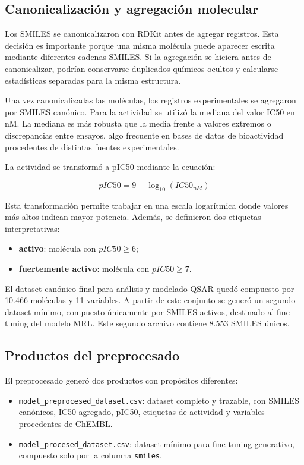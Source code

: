 \documentclass[IB]{TFUOC}%
\begin{document}
\subsection{Canonicalización y agregación molecular}

Los SMILES se canonicalizaron con RDKit antes de agregar registros. Esta decisión es importante porque una misma molécula puede aparecer escrita mediante diferentes cadenas SMILES. Si la agregación se hiciera antes de canonicalizar, podrían conservarse duplicados químicos ocultos y calcularse estadísticas separadas para la misma estructura.

Una vez canonicalizadas las moléculas, los registros experimentales se agregaron por SMILES canónico. Para la actividad se utilizó la mediana del valor IC50 en nM. La mediana es más robusta que la media frente a valores extremos o discrepancias entre ensayos, algo frecuente en bases de datos de bioactividad procedentes de distintas fuentes experimentales.

La actividad se transformó a pIC50 mediante la ecuación:

\begin{equation}
    pIC50 = 9 - \log_{10}(IC50_{nM})
\end{equation}

Esta transformación permite trabajar en una escala logarítmica donde valores más altos indican mayor potencia. Además, se definieron dos etiquetas interpretativas:

\begin{itemize}
    \item \textbf{activo}: molécula con $pIC50 \geq 6$;
    \item \textbf{fuertemente activo}: molécula con $pIC50 \geq 7$.
\end{itemize}

El dataset canónico final para análisis y modelado QSAR quedó compuesto por 10.466 moléculas y 11 variables. A partir de este conjunto se generó un segundo dataset mínimo, compuesto únicamente por SMILES activos, destinado al fine-tuning del modelo MRL. Este segundo archivo contiene 8.553 SMILES únicos.

\subsection{Productos del preprocesado}

El preprocesado generó dos productos con propósitos diferentes:

\begin{itemize}
    \item \texttt{model\_preprocesed\_dataset.csv}: dataset completo y trazable, con SMILES canónicos, IC50 agregado, pIC50, etiquetas de actividad y variables procedentes de ChEMBL.
    \item \texttt{model\_procesed\_dataset.csv}: dataset mínimo para fine-tuning generativo, compuesto solo por la columna \texttt{smiles}.
\end{itemize}
\end{document}
